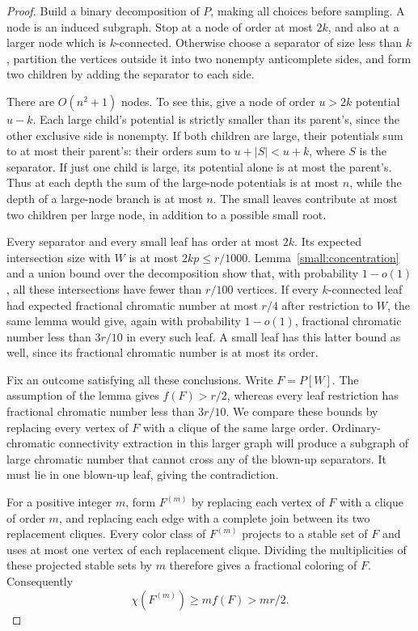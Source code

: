 \begin{proof}
Build a binary decomposition of $P$, making all choices before sampling.
A node is an induced subgraph. Stop at a node of order at most $2k$, and
also at a larger node which is $k$-connected. Otherwise choose a separator
of size less than $k$, partition the vertices outside it into two
nonempty anticomplete sides, and form two children by adding the
separator to each side.

There are $O(n^2+1)$ nodes. To see this, give a node of order $u>2k$
potential $u-k$. Each large child's potential is strictly smaller than
its parent's, since the other exclusive side is nonempty. If both
children are large, their potentials sum to at most their parent's:
their orders sum to $u+|S|<u+k$, where $S$ is the separator. If just one
child is large, its potential alone is at most the parent's. Thus at
each depth the sum of the large-node potentials is at most $n$, while
the depth of a large-node branch is at most $n$. The small leaves
contribute at most two children per large node, in addition to a possible
small root.

Every separator and every small leaf has order at most $2k$. Its expected
intersection size with $W$ is at most $2kp\le r/1000$.
Lemma~\ref{small:concentration} and a union bound over the decomposition
show that, with probability $1-o(1)$, all these intersections have fewer
than $r/100$ vertices. If every $k$-connected leaf had expected fractional
chromatic number at most $r/4$ after restriction to $W$, the same lemma
would give, again with probability $1-o(1)$, fractional chromatic number
less than $3r/10$ in every such leaf. A small leaf has this latter bound
as well, since its fractional chromatic number is at most its order.

Fix an outcome satisfying all these conclusions. Write $F=P[W]$.
The assumption of the lemma gives $f(F)>r/2$, whereas every leaf
restriction has fractional chromatic number less than $3r/10$.
We compare these bounds by replacing every vertex of $F$ with a clique
of the same large order. Ordinary-chromatic connectivity extraction in
this larger graph will produce a subgraph of large chromatic number that
cannot cross any of the blown-up separators. It must lie in one
blown-up leaf, giving the contradiction.

For a positive integer $m$, form $F^{(m)}$ by replacing each vertex of
$F$ with a clique of order $m$, and replacing each edge with a complete
join between its two replacement cliques. Every color class of $F^{(m)}$ projects to a stable
set of $F$ and uses at most one vertex of each replacement clique.
Dividing the multiplicities of these projected stable sets by $m$
therefore gives a fractional coloring of $F$. Consequently
\begin{equation}\label{small:blowup-lower}
 \chi(F^{(m)})\ge mf(F)>mr/2.
\end{equation}


\end{proof}

